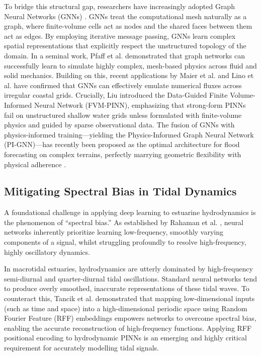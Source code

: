 To bridge this structural gap, researchers have increasingly adopted Graph Neural Networks (GNNs) \cite{Scarselli2009, Gilmer2017}. GNNs treat the computational mesh naturally as a graph, where finite-volume cells act as nodes and the shared faces between them act as edges. By employing iterative message passing, GNNs learn complex spatial representations that explicitly respect the unstructured topology of the domain. In a seminal work, Pfaff et al. \cite{Pfaff2021} demonstrated that graph networks can successfully learn to simulate highly complex, mesh-based physics across fluid and solid mechanics. Building on this, recent applications by Maier et al. \cite{Maier2023} and Lino et al. \cite{Lino2023} have confirmed that GNNs can effectively emulate numerical fluxes across irregular coastal grids. Crucially, Liu \cite{Liu2026} introduced the Data-Guided Finite Volume-Informed Neural Network (FVM-PINN), emphasizing that strong-form PINNs fail on unstructured shallow water grids unless formulated with finite-volume physics and guided by sparse observational data. The fusion of GNNs with physics-informed training---yielding the Physics-Informed Graph Neural Network (PI-GNN)---has recently been proposed as the optimal architecture for flood forecasting on complex terrains, perfectly marrying geometric flexibility with physical adherence \cite{Taghizadeh2025, Balogun2025}.

\subsection{Mitigating Spectral Bias in Tidal Dynamics}

A foundational challenge in applying deep learning to estuarine hydrodynamics is the phenomenon of ``spectral bias.'' As established by Rahaman et al. \cite{Rahaman2019}, neural networks inherently prioritize learning low-frequency, smoothly varying components of a signal, whilst struggling profoundly to resolve high-frequency, highly oscillatory dynamics. 

In macrotidal estuaries, hydrodynamics are utterly dominated by high-frequency semi-diurnal and quarter-diurnal tidal oscillations. Standard neural networks tend to produce overly smoothed, inaccurate representations of these tidal waves. To counteract this, Tancik et al. \cite{Tancik2020} demonstrated that mapping low-dimensional inputs (such as time and space) into a high-dimensional periodic space using Random Fourier Feature (RFF) embeddings empowers networks to overcome spectral bias, enabling the accurate reconstruction of high-frequency functions. Applying RFF positional encoding to hydrodynamic PINNs is an emerging and highly critical requirement for accurately modelling tidal signals.

